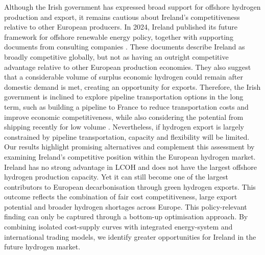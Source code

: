 \documentclass[pdflatex,lineno,sn-mathphys,Numbered]{sn-jnl}%
\begin{document}
Although the Irish government has expressed broad support for offshore hydrogen production and export, it remains cautious about Ireland's competitiveness relative to other European producers.
In 2024, Ireland published its future framework for offshore renewable energy policy, together with supporting documents from consulting companies \cite{OffshoreRenewablesSurplus}. These documents describe Ireland as broadly competitive globally, but not as having an outright competitive advantage relative to other European production economies. They also suggest that a considerable volume of surplus economic hydrogen could remain after domestic demand is met, creating an opportunity for exports. 
Therefore, the Irish government is inclined to explore pipeline transportation options in the long term, such as building a pipeline to France to reduce transportation costs and improve economic competitiveness, while also considering the potential from shipping recently for low volume \cite{DCEEHydrogenExport2025}.
Nevertheless, if hydrogen export is largely constrained by pipeline transportation, capacity and flexibility will be limited.
Our results highlight promising alternatives and complement this assessment by examining Ireland's competitive position within the European hydrogen market.
Ireland has no strong advantage in LCOH and does not have the largest offshore hydrogen production capacity. Yet it can still become one of the largest contributors to European decarbonisation through green hydrogen exports. This outcome reflects the combination of fair cost competitiveness, large export potential and broader hydrogen shortages across Europe.
This policy-relevant finding can only be captured through a bottom-up optimisation approach. By combining isolated cost-supply curves with integrated energy-system and international trading models, we identify greater opportunities for Ireland in the future hydrogen market.
\end{document}
